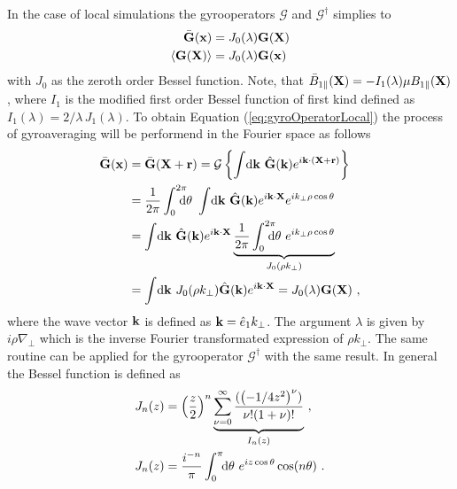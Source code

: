 In the case of local simulations the gyrooperators $\mathcal{G}$ and $\mathcal{G}^\dagger$ simplies to
\begin{gather}
    \begin{aligned}
        \bar{\boldsymbol{\mathbf{G}}}(\boldsymbol{\mathbf{x}}) &= J_0(\lambda) \boldsymbol{\mathbf{G}}(\boldsymbol{\mathbf{X}}) \\
        \langle\boldsymbol{\mathbf{G}}(\boldsymbol{\mathbf{X}})\rangle &= J_0(\lambda) \boldsymbol{\mathbf{G}}(\boldsymbol{\mathbf{x}})
    \end{aligned}
    \label{eq:gyroOperatorLocal}
\end{gather}
with $J_0$ as the zeroth order Bessel function. Note, that $\bar{B}_{1\parallel}(\boldsymbol{\mathbf{X}}) = - I_1(\lambda)\mu B_{1\parallel} (\boldsymbol{\mathbf{X}})$, where $I_1$ is the modified first order Bessel function of first kind defined as $I_1(\lambda) = 2/\lambda \, J_1(\lambda)$. To obtain Equation (\ref{eq:gyroOperatorLocal}) the process of gyroaveraging will be performend in the Fourier space as follows
\begin{gather}
    \begin{aligned}
        \ga{\vect{G}}(\x) &= \ga{\vect{G}}(\X + \vect{r}) = \tga{\left\{\ints \mathrm{d}\vect{k} ~ \hat{\vect{G}}(\vect{k}) e^{i \vect{k} \cdot (\X + \vect{r})} \right\}} \\
                          &= \frac{1}{2\pi} \intss{0}{2\pi} \dtheta ~ \ints \mathrm{d}\vect{k} ~ \hat{\vect{G}}(\vect{k}) e^{i \vect{k} \cdot \X} e^{ i k_\perp \rho \cos \theta} \\
                          &= \ints \mathrm{d}\vect{k} ~ \hat{\vect{G}}(\vect{k}) e^{i \vect{k} \cdot \X} \underbrace{\frac{1}{2\pi} \intss{0}{2\pi} \dtheta ~ e^{ i k_\perp \rho \cos \theta}}_{J_0(\rho k_\perp)}\\
                          &= \ints \mathrm{d}\vect{k} ~ J_0(\rho k_\perp) \hat{\vect{G}}(\vect{k}) e^{i \vect{k} \cdot \X} = J_0(\lambda) \vect{G}(\X)~,
    \end{aligned}
    \label{eq:gyroOperatorLocalDerivation}
\end{gather}
where the wave vector $\boldsymbol{\mathbf{k}}$ is defined as $\boldsymbol{\mathbf{k}} = \hat{e}_1 k_\perp$. The argument $\lambda$ is given by $i \rho \nabla_{\!\perp}$ which is the inverse Fourier transformated expression of $\rho k_\perp$. The same routine can be applied for the gyrooperator $\mathcal{G}^\dagger$ with the same result. In general the Bessel function is defined as \cite{Dannert_PHD}
\begin{gather}
    \begin{aligned}
        J_n(z) &= \left(\frac{z}{2}\right)^n \underbrace{\sum^{\infty}_{\nu = 0} \frac{(\left(- 1/4 z^2\right)^\nu)}{\nu! (1 + \nu) !}}_{I_n(z)}~, \\
        J_n(z) &= \frac{i^{-n}}{\pi} \int_{0}^{\pi}\!\!\mathrm{d}\theta ~ e^{i z \cos \theta} \cos (n\theta)~.
    \end{aligned}
    \label{eq:Besselfunction}
\end{gather}

